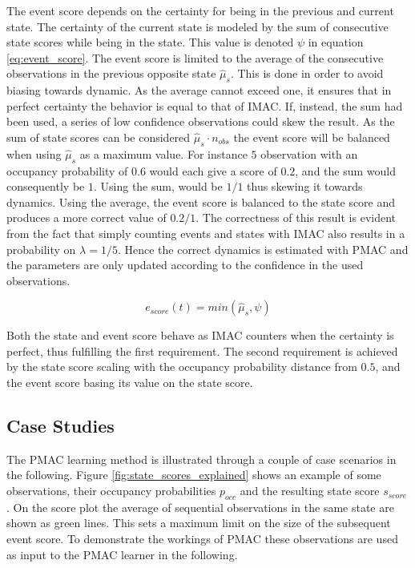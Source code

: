 The event score depends on the certainty for being in the previous and current state. 
The certainty of the current state is modeled by the sum of consecutive state scores while being in the state. This value is denoted $\psi$ in equation \ref{eq:event_score}.
The event score is limited to the average of the consecutive observations in the previous opposite state $\hat{\mu}_{s}$. 
This is done in order to avoid biasing towards dynamic.
As the average cannot exceed one, it ensures that in perfect certainty the behavior is equal to that of IMAC. 
If, instead, the sum had been used, a series of low confidence observations could skew the result. 
As the sum of state scores can be considered $\hat{\mu}_s \cdot n_{obs}$ the event score will be balanced when using $\hat{\mu}_s$ as a maximum value. 
For instance $5$ observation with an occupancy probability of $0.6$ would each give a score of $0.2$, and the sum would consequently be $1$. 
Using the sum,  would be $1/1$  thus skewing it towards dynamics. Using the average, the event score is balanced to the state score and produces a more correct value of $0.2/1$. 
The correctness of this result is evident from the fact that simply counting events and states with IMAC also results in a probability on $\lambda = 1/5$. 
Hence the correct dynamics is estimated with PMAC and the parameters are only updated according to the confidence in the used observations.

\begin{equation}
e_{score}(t)=min(\hat{\mu}_{s},\psi)
\label{eq:event_score}
\end{equation}

Both the state and event score behave as IMAC counters when the certainty is perfect, thus fulfilling the first requirement. The second requirement is achieved by the state score scaling with the occupancy probability distance from $0.5$, and the event score basing its value on the state score.

\subsection{Case Studies}
The PMAC learning method is illustrated through a couple of case scenarios in the following. 
Figure \ref{fig:state_scores_explained} shows an example of some observations, their occupancy probabilities $p_{occ}$ and the resulting state score $s_{score}$. On the score plot the average of sequential observations in the same state are shown as green lines. This sets a maximum limit on the size of the subsequent event score. To demonstrate the workings of PMAC these observations are used as input to the PMAC learner in the following. 

